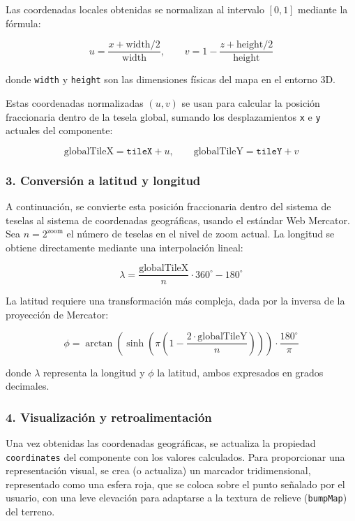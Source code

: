 \documentclass[a4paper, 12pt]{book}
\begin{document}
Las coordenadas locales obtenidas se normalizan al intervalo $[0,1]$ mediante la fórmula:

\[
u = \frac{x + \text{width}/2}{\text{width}}, \qquad v = 1 - \frac{z + \text{height}/2}{\text{height}}
\]

donde \texttt{width} y \texttt{height} son las dimensiones físicas del mapa en el entorno 3D.

Estas coordenadas normalizadas $(u, v)$ se usan para calcular la posición fraccionaria dentro de la tesela global, sumando los desplazamientos \texttt{x} e \texttt{y} actuales del componente:

\[
\text{globalTileX} = \texttt{tileX} + u, \qquad \text{globalTileY} = \texttt{tileY} + v
\]

\subsubsection*{3. Conversión a latitud y longitud}

A continuación, se convierte esta posición fraccionaria dentro del sistema de teselas al sistema de coordenadas geográficas, usando el estándar Web Mercator. Sea $n = 2^\text{zoom}$ el número de teselas en el nivel de zoom actual. La longitud se obtiene directamente mediante una interpolación lineal:

\[
\lambda = \frac{\text{globalTileX}}{n} \cdot 360^\circ - 180^\circ
\]

La latitud requiere una transformación más compleja, dada por la inversa de la proyección de Mercator:

\[
\phi = \arctan\left(\sinh\left(\pi \left(1 - \frac{2 \cdot \text{globalTileY}}{n}\right)\right)\right) \cdot \frac{180^\circ}{\pi}
\]

donde $\lambda$ representa la longitud y $\phi$ la latitud, ambos expresados en grados decimales.

\subsubsection*{4. Visualización y retroalimentación}

Una vez obtenidas las coordenadas geográficas, se actualiza la propiedad \texttt{coordinates} del componente con los valores calculados. Para proporcionar una representación visual, se crea (o actualiza) un marcador tridimensional, representado como una esfera roja, que se coloca sobre el punto señalado por el usuario, con una leve elevación para adaptarse a la textura de relieve (\texttt{bumpMap}) del terreno.
\end{document}

